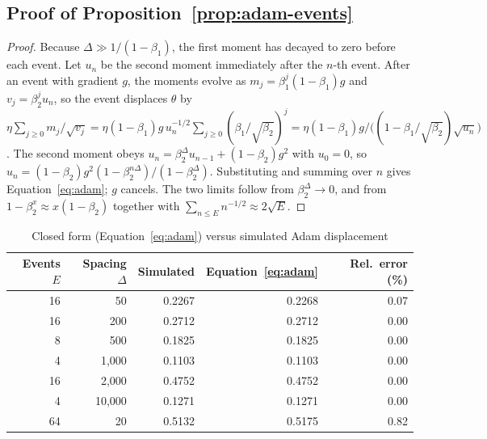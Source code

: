 \documentclass{article} %
\begin{document}
\subsection{Proof of Proposition~\ref{prop:adam-events}}
\label{app:prop3proof}

\begin{proof}
Because $\Delta\gg1/(1-\beta_1)$, the first moment has decayed to zero before each
event. Let $u_n$ be the second moment immediately after the $n$-th event. After an
event with gradient $g$, the moments evolve as $m_{j}=\beta_1^{j}(1-\beta_1)g$ and
$v_{j}=\beta_2^{j}u_n$, so the event displaces $\theta$ by
$\eta\sum_{j\geq0}m_j/\sqrt{v_j}=\eta(1-\beta_1)g\,u_n^{-1/2}\sum_{j\ge0}(\beta_1/\sqrt{\beta_2})^{j}
=\eta(1-\beta_1)g/\bigl((1-\beta_1/\sqrt{\beta_2})\sqrt{u_n}\bigr)$.
The second moment obeys $u_n=\beta_2^{\Delta}u_{n-1}+(1-\beta_2)g^2$ with $u_0=0$,
so $u_n=(1-\beta_2)g^2(1-\beta_2^{n\Delta})/(1-\beta_2^{\Delta})$. Substituting and
summing over $n$ gives Equation~\ref{eq:adam}; $g$ cancels. The two limits follow
from $\beta_2^{\Delta}\to0$, and from $1-\beta_2^{x}\approx x(1-\beta_2)$ together
with $\sum_{n\le E}n^{-1/2}\approx2\sqrt{E}$.
\end{proof}

\begin{table}[ht]
\caption{Closed form (Equation~\ref{eq:adam}) versus simulated Adam displacement}
\label{tab:adam-closed}
\begin{center}
\begin{tabular}{rrrrr}
\toprule
Events $E$ & Spacing $\Delta$ & Simulated & Equation~\ref{eq:adam} & Rel.\ error (\%) \\
\midrule
16 & 50 & 0.2267 & 0.2268 & 0.07 \\
16 & 200 & 0.2712 & 0.2712 & 0.00 \\
8 & 500 & 0.1825 & 0.1825 & 0.00 \\
4 & 1{,}000 & 0.1103 & 0.1103 & 0.00 \\
16 & 2{,}000 & 0.4752 & 0.4752 & 0.00 \\
4 & 10{,}000 & 0.1271 & 0.1271 & 0.00 \\
64 & 20 & 0.5132 & 0.5175 & 0.82 \\
\bottomrule
\end{tabular}
\end{center}
\end{table}
\end{document}
